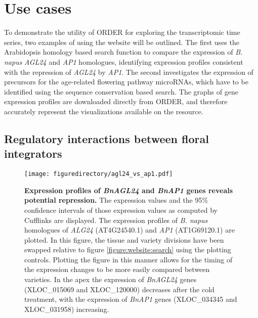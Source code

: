 \documentclass[12pt,]{book}
\begin{document}
\section{Use cases}\label{use-cases}

To demonstrate the utility of ORDER for exploring the transcriptomic
time series, two examples of using the website will be outlined. The
first uses the Arabidopsis homology based search function to compare the
expression of \emph{B. napus} \emph{AGL24} and \emph{AP1} homologues,
identifying expression profiles consistent with the repression of
\emph{AGL24} by \emph{AP1}. The second investigates the expression of
precursors for the age-related flowering pathway microRNAs, which have
to be identified using the sequence conservation based search. The
graphs of gene expression profiles are downloaded directly from ORDER,
and therefore accurately represent the visualizations available on the
resource.

\subsection{Regulatory interactions between floral
integrators}\label{regulatory-interactions-between-floral-integrators}

\begin{figure}[htbp]
\centering
\texttt{[image: figuredirectory/agl24\_vs\_ap1.pdf]}
\caption{\textbf{Expression profiles of \emph{BnAGL24} and \emph{BnAP1}
genes reveals potential repression.} The expression values and the 95\%
confidence intervals of those expression values as computed by Cufflinks
are displayed. The expression profiles of \emph{B. napus} homologues of
\emph{ALG24} (AT4G24540.1) and \emph{AP1} (AT1G69120.1) are plotted. In
this figure, the tissue and variety divisions have been swapped relative
to figure \ref{figure:website:search} using the plotting controls.
Plotting the figure in this manner allows for the timing of the
expression changes to be more easily compared between varieties. In the
apex the expression of \emph{BnAGL24} genes (XLOC\_015069 and
XLOC\_120000) decreases after the cold treatment, with the expression of
\emph{BnAP1} genes (XLOC\_034345 and XLOC\_031958)
increasing.}\label{figure:winter:agl24ap1}
\end{figure}
\end{document}
